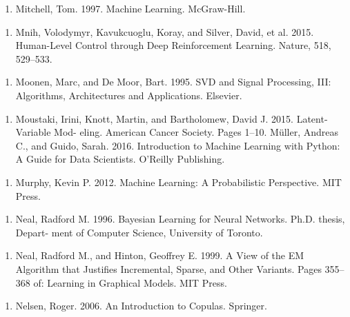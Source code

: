 \begin{enumerate}
\item Mitchell, Tom. 1997. Machine Learning. McGraw-Hill.
\end{enumerate}

\begin{enumerate}
\item Mnih, Volodymyr, Kavukcuoglu, Koray, and Silver, David, et al. 2015. Human-Level Control through Deep Reinforcement Learning. Nature, 518, 529–533.
\end{enumerate}

\begin{enumerate}
\item Moonen, Marc, and De Moor, Bart. 1995. SVD and Signal Processing, III: Algorithms, Architectures and Applications. Elsevier.
\end{enumerate}

\begin{enumerate}
\item Moustaki, Irini, Knott, Martin, and Bartholomew, David J. 2015. Latent-Variable Mod- eling. American Cancer Society. Pages 1–10. Müller, Andreas C., and Guido, Sarah. 2016. Introduction to Machine Learning with Python: A Guide for Data Scientists. O’Reilly Publishing.
\end{enumerate}

\begin{enumerate}
\item Murphy, Kevin P. 2012. Machine Learning: A Probabilistic Perspective. MIT Press.
\end{enumerate}

\begin{enumerate}
\item Neal, Radford M. 1996. Bayesian Learning for Neural Networks. Ph.D. thesis, Depart- ment of Computer Science, University of Toronto.
\end{enumerate}

\begin{enumerate}
\item Neal, Radford M., and Hinton, Geoffrey E. 1999. A View of the EM Algorithm that Justiﬁes Incremental, Sparse, and Other Variants. Pages 355–368 of: Learning in Graphical Models. MIT Press.
\end{enumerate}

\begin{enumerate}
\item Nelsen, Roger. 2006. An Introduction to Copulas. Springer.
\end{enumerate}

